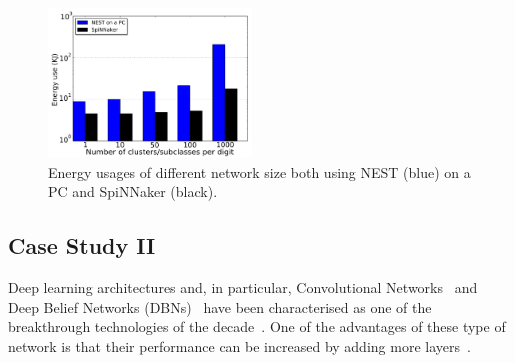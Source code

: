 \documentclass{frontiersENG} %
\begin{document}
\begin{table}[h]
\begin{center}
\begin{tabular} {l| c  c c c c c}
%			
		\end{tabular}
    \egroup
		\label{tbl:compare}
	\end{center}
\end{table}

\begin{figure}[hbt!]
	\centering
	\includegraphics[width=0.48\textwidth]{fig8}
	\caption{Energy usages of different network size both using NEST (blue) on a PC and SpiNNaker (black).}
	\label{fig:energy}
\end{figure}
\subsection{Case Study II}
Deep learning architectures and, in particular, Convolutional Networks~\citep{lecun1998gradient} and Deep Belief Networks (DBNs)~\citep{hinton2006fast} have been characterised as one of the breakthrough technologies of the decade~\citep{MIT_TechReview}. One of the advantages of these type of network is that their performance can be increased by adding more layers~\citep{hinton2006fast}.
\end{document}
